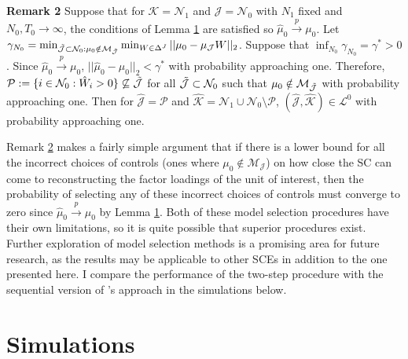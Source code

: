 \documentclass{article}
\begin{document}
\textbf{Remark 2}\label{R2} Suppose that for $\mathcal{K} = \mathcal{N}_1$ and $\mathcal{J} = \mathcal{N}_0$ with $N_1$ fixed and $N_0,T_0 \rightarrow \infty$, the conditions of Lemma \hyperref[L1]{1} are satisfied so $\hat{\mu}_0 \overset{p}{\rightarrow} \mu_0$. Let $\gamma_{N_0} = \min_{\Tilde{\mathcal{J}} \subset \mathcal{N}_0 : \mu_0 \notin \mathcal{M}_{\Tilde{\mathcal{J}}}} \min_{W \in \Delta^J} ||\mu_0 - \mu_{\mathcal{J}}W||_2$. Suppose that $\inf_{N_0}\gamma_{N_0} = \gamma^* >0$. Since $\hat{\mu}_0 \overset{p}{\rightarrow} \mu_0$, $||\hat{\mu}_0 - \mu_0||_2 < \gamma^*$ with probability approaching one. Therefore, $\mathcal{P} := \{i \in \mathcal{N}_0: \hat{W}_i > 0\} \not\subseteq \Tilde{\mathcal{J}}$ for all $\Tilde{\mathcal{J}} \subset \mathcal{N}_0$ such that $\mu_0 \notin \mathcal{M}_{\Tilde{\mathcal{J}}}$ with probability approaching one. Then for $\hat{\mathcal{J}} = \mathcal{P}$ and $\hat{\mathcal{K}} = \mathcal{N}_1 \cup \mathcal{N}_0 \setminus \mathcal{P}$, $(\hat{\mathcal{J}}, \hat{\mathcal{K}}) \in \mathcal{L}^0$ with probability approaching one.
\par
Remark \hyperref[R2]{2} makes a fairly simple argument that if there is a lower bound for all the incorrect choices of controls (ones where $\mu_0 \notin \mathcal{M}_{\mathcal{J}}$) on how close the SC can come to reconstructing the factor loadings of the unit of interest, then the probability of selecting any of these incorrect choices of controls must converge to zero since $\hat{\mu}_0 \overset{p}{\rightarrow} \mu_0$ by Lemma \hyperref[L1]{1}. Both of these model selection procedures have their own limitations, so it is quite possible that superior procedures exist. Further exploration of model selection methods is a promising area for future research, as the results may be applicable to other SCEs in addition to the one presented here. I compare the performance of the two-step procedure with the sequential version of \cite{MomentSelection}'s approach in the simulations below.

\section{Simulations} \label{Simulations}
\end{document}
